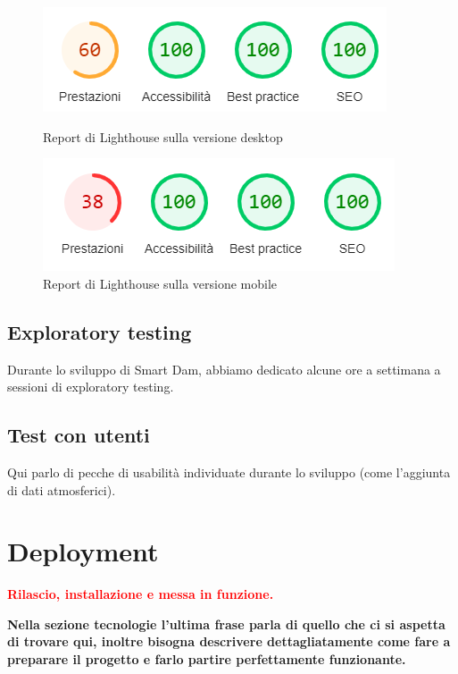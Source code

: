 \documentclass[a4paper,12pt]{report}
\begin{document}
\begin{figure}
	\centering
	\begin{minipage}{0.45\textwidth}
		\includegraphics[scale=0.7]{lighthouse_report_desktop}
		\caption{Report di Lighthouse sulla versione desktop}
		\label{fig:lighthouse_report_desktop}
	\end{minipage}
	\hfill
	\begin{minipage}{0.45\textwidth}
		\includegraphics[scale=0.7]{lighthouse_report_mobile}
		\caption{Report di Lighthouse sulla versione mobile}
		\label{fig:lighthouse_report_mobile}
	\end{minipage}
\end{figure}

\section{Exploratory testing}
Durante lo sviluppo di Smart Dam, abbiamo dedicato alcune ore a settimana a sessioni di exploratory testing.

\section{Test con utenti}
Qui parlo di pecche di usabilità individuate durante lo sviluppo (come l'aggiunta di dati atmosferici).

\clearpage
\chapter{Deployment}\label{sec:deployment}
\textcolor{red}{\textbf{Rilascio, installazione e messa in funzione.}}

\textbf{Nella sezione tecnologie l'ultima frase parla di quello che ci si aspetta di trovare qui, inoltre bisogna descrivere dettagliatamente come fare a preparare il progetto e farlo partire perfettamente funzionante.}
\end{document}
